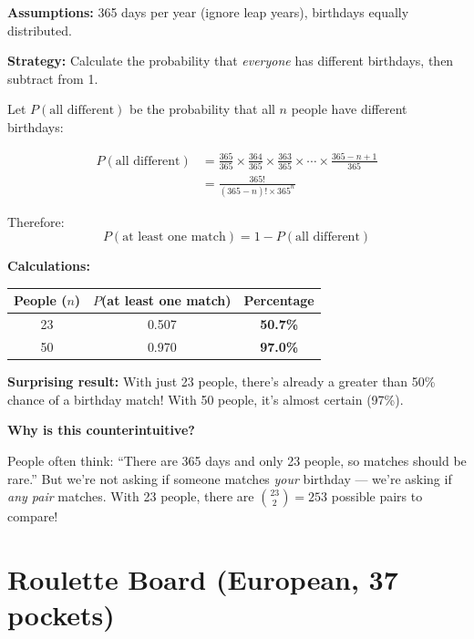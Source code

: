 \documentclass[11pt,a4paper]{article}
\begin{document}
\begin{answer}
\textbf{Assumptions:} 365 days per year (ignore leap years), birthdays equally distributed.

\vspace{0.3cm}
\textbf{Strategy:} Calculate the probability that \textit{everyone} has different birthdays, then subtract from 1.

\vspace{0.3cm}
Let $P(\text{all different})$ be the probability that all $n$ people have different birthdays:

\begin{align}
P(\text{all different}) &= \frac{365}{365} \times \frac{364}{365} \times \frac{363}{365} \times \cdots \times \frac{365-n+1}{365}\\
&= \frac{365!}{(365-n)! \times 365^n}
\end{align}

Therefore:
\[
P(\text{at least one match}) = 1 - P(\text{all different})
\]

\vspace{0.3cm}
\textbf{Calculations:}

\begin{center}
\begin{tabular}{|c|c|c|}
\hline
\textbf{People ($n$)} & \textbf{$P$(at least one match)} & \textbf{Percentage} \\
\hline
23 & 0.507 & \textbf{50.7\%} \\
\hline
50 & 0.970 & \textbf{97.0\%} \\
\hline
\end{tabular}
\end{center}

\vspace{0.3cm}
\textbf{Surprising result:} With just 23 people, there's already a greater than 50\% chance of a birthday match! With 50 people, it's almost certain (97\%).

\vspace{0.3cm}
\textbf{Why is this counterintuitive?}

People often think: ``There are 365 days and only 23 people, so matches should be rare.'' But we're not asking if someone matches \textit{your} birthday — we're asking if \textit{any pair} matches. With 23 people, there are $\binom{23}{2} = 253$ possible pairs to compare!
\end{answer}

\newpage
\section{Roulette Board (European, 37 pockets)}
\end{document}
